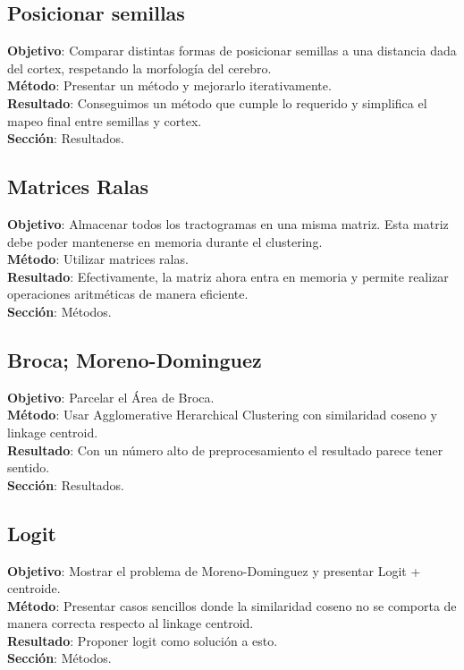                     
\subsection{Posicionar semillas}
\textbf{Objetivo}:  Comparar distintas formas de posicionar semillas a una distancia
                    dada del cortex, respetando la morfolog\'ia del cerebro. \\
\textbf{M\'etodo}:  Presentar un m\'etodo y mejorarlo iterativamente. \\
\textbf{Resultado}: Conseguimos un m\'etodo que cumple lo requerido y simplifica
                    el mapeo final entre semillas y cortex.\\
\textbf{Secci\'on}: Resultados.\\

\subsection{Matrices Ralas}
\textbf{Objetivo}:  Almacenar todos los tractogramas en una misma matriz. Esta 
                    matriz debe poder mantenerse en memoria durante el clustering.\\
\textbf{M\'etodo}:  Utilizar matrices ralas. \\
\textbf{Resultado}: Efectivamente, la matriz ahora entra en memoria y permite 
                    realizar operaciones aritm\'eticas de manera eficiente.\\
\textbf{Secci\'on}: M\'etodos.\\                    

\subsection{Broca; Moreno-Dominguez}
\textbf{Objetivo}:  Parcelar el \'Area de Broca.\\
\textbf{M\'etodo}:  Usar Agglomerative Herarchical Clustering con similaridad
                    coseno y linkage centroid. \\
\textbf{Resultado}: Con un n\'umero alto de preprocesamiento el resultado parece
                    tener sentido.\\
\textbf{Secci\'on}: Resultados.\\                    
                    
\subsection{Logit}
\textbf{Objetivo}:  Mostrar el problema de Moreno-Dominguez y presentar Logit
                    + centroide.\\
\textbf{M\'etodo}:  Presentar casos sencillos donde la similaridad coseno no
                    se comporta de manera correcta respecto al linkage centroid. \\
\textbf{Resultado}: Proponer logit como soluci\'on a esto.\\
\textbf{Secci\'on}: M\'etodos.\\                                        
                    
